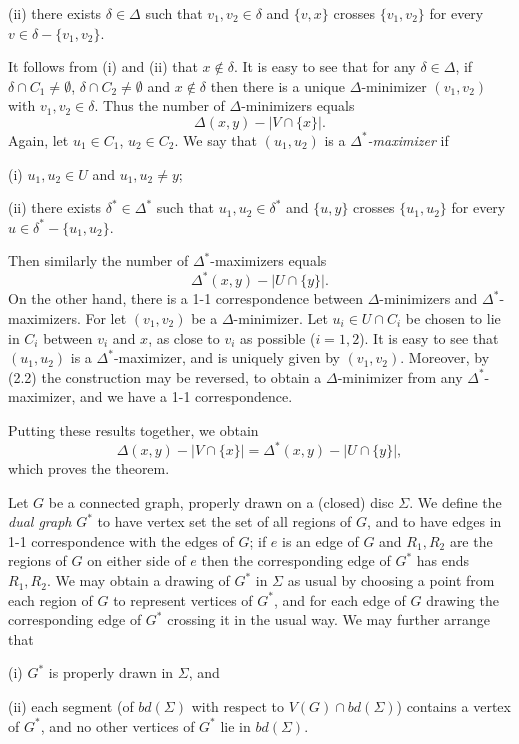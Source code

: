 \hspace*{12pt}(ii) there exists $\delta \in \Delta$ such that $v_1, v_2 \in \delta$ and $\{v, x\}$ crosses $\{v_1, v_2\}$ for every $v \in \delta - \{v_1, v_2\}$.

It follows from (i) and (ii) that $x \notin \delta$. It is easy to see that for any $\delta \in \Delta$, if $\delta \cap C_1 \ne \emptyset$, $\delta \cap C_2 \ne \emptyset$ and $x \notin \delta$ then there is a unique $\Delta$-minimizer $(v_1, v_2)$ with $v_1, v_2 \in \delta$. Thus the number of $\Delta$-minimizers equals
\begin{equation*}
\Delta(x, y) - |V \cap \{x\}|.
\end{equation*}
Again, let $u_1 \in C_1$, $u_2 \in C_2$. We say that $(u_1, u_2)$ is a \textit{$\Delta^*$-maximizer} if

\hspace*{12pt}(i) $u_1, u_2 \in U$ and $u_1, u_2 \ne y$;

\hspace*{12pt}(ii) there exists $\delta^* \in \Delta^*$ such that $u_1, u_2 \in \delta^*$ and $\{u, y\}$ crosses $\{u_1, u_2\}$ for every $u \in \delta^* - \{u_1, u_2\}$.

Then similarly the number of $\Delta^*$-maximizers equals
\begin{equation*}
\Delta^*(x, y) - |U \cap \{y\}|.
\end{equation*}
On the other hand, there is a 1-1 correspondence between $\Delta$-minimizers and $\Delta^*$-maximizers. For let $(v_1, v_2)$ be a $\Delta$-minimizer. Let $u_i \in U \cap C_i$ be chosen to lie in $C_i$ between $v_i$ and $x$, as close to $v_i$ as possible ($i = 1, 2$). It is easy to see that $(u_1, u_2)$ is a $\Delta^*$-maximizer, and is uniquely given by $(v_1, v_2)$. Moreover, by (2.2) the construction may be reversed, to obtain a $\Delta$-minimizer from any $\Delta^*$-maximizer, and we have a 1-1 correspondence.

Putting these results together, we obtain
\begin{equation*}
\Delta(x, y) - |V \cap \{x\}| = \Delta^*(x, y) - |U \cap \{y\}|,
\end{equation*}
which proves the theorem.


Let $G$ be a connected graph, properly drawn on a (closed) disc $\Sigma$. We define the \textit{dual graph} $G^*$ to have vertex set the set of all regions of $G$, and to have edges in 1-1 correspondence with the edges of $G$; if $e$ is an edge of $G$ and $R_1, R_2$ are the regions of $G$ on either side of $e$ then the corresponding edge of $G^*$ has ends $R_1, R_2$. We may obtain a drawing of $G^*$ in $\Sigma$ as usual by choosing a point from each region of $G$ to represent vertices of $G^*$, and for each edge of $G$ drawing the corresponding edge of $G^*$ crossing it in the usual way. We may further arrange that

\hspace*{12pt}(i) $G^*$ is properly drawn in $\Sigma$, and

\hspace*{12pt}(ii) each segment (of $bd(\Sigma)$ with respect to $V(G) \cap bd(\Sigma)$) contains a vertex of $G^*$, and no other vertices of $G^*$ lie in $bd(\Sigma)$.
